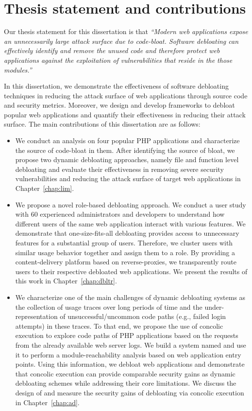 \section{Thesis statement and contributions}

Our thesis statement for this dissertation is that \textit{``Modern web applications expose an unnecessarily large attack surface due to code-bloat. Software debloating can effectively identify and remove the unused code and therefore protect web applications against the exploitation of vulnerabilities that reside in the those modules.''}

In this dissertation, we demonstrate the effectiveness of software debloating techniques in reducing the attack surface of web applications through source code and security metrics. 
Moreover, we design and develop frameworks to debloat popular web applications and quantify their effectiveness in reducing their attack surface. The main contributions of this dissertation are as follows:

\begin{itemize}
    \item We conduct an analysis on four popular PHP applications and characterize the source of code-bloat in them. After identifying the source of bloat, we propose two dynamic debloating approaches, namely file and function level debloating and evaluate their effectiveness in removing severe security vulnerabilities and reducing the attack surface of target web applications in Chapter~\ref{chap:lim}.
    \item We propose a novel role-based debloating approach. We conduct a user study with 60 experienced administrators and developers to understand how different users of the same web application interact with various features. We demonstrate that one-size-fits-all debloating provides access to unnecessary features for a substantial group of users. Therefore, we cluster users with similar usage behavior together and assign them to a role. By providing a content-delivery platform based on reverse-proxies, we transparently route users to their respective debloated web applications. We present the results of this work in Chapter~\ref{chap:dbltr}. 
    \item We characterize one of the main challenges of dynamic debloating systems as the collection of usage traces over long periods of time and the under-representation of unsuccessful/uncommon code paths (e.g., failed login attempts) in these traces. To that end, we propose the use of concolic execution to explore code paths of PHP applications based on the requests from the already available web server logs. We build a system named \animatedead{} and use it to perform a module-reachability analysis based on web application entry points. Using this information, we debloat web applications and demonstrate that concolic execution can provide comparable security gains as dynamic debloating schemes while addressing their core limitations. We discuss the design of \animatedead{} and measure the security gains of debloating via concolic execution in Chapter~\ref{chap:ad}.
\end{itemize}